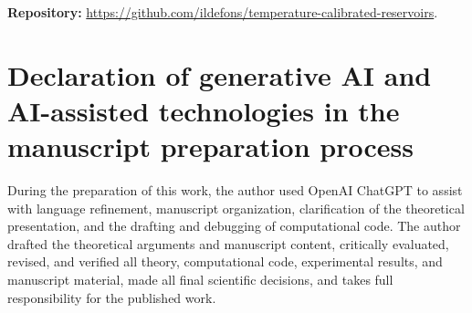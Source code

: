 \documentclass[11pt,a4paper]{article}
\begin{document}
\noindent\textbf{Repository:} \url{https://github.com/ildefons/temperature-calibrated-reservoirs}.


\section*{Declaration of generative AI and AI-assisted technologies in the manuscript preparation process}

During the preparation of this work, the author used OpenAI ChatGPT to assist with language refinement, manuscript organization, clarification of the theoretical presentation, and the drafting and debugging of computational code. The author drafted the theoretical arguments and manuscript content, critically evaluated, revised, and verified all theory, computational code, experimental results, and manuscript material, made all final scientific decisions, and takes full responsibility for the published work.
\end{document}
